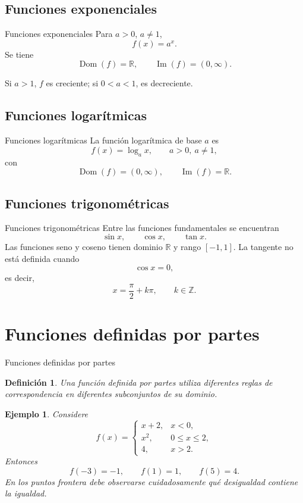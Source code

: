 \documentclass[aspectratio=169,10pt]{beamer}
\newtheorem{definicion}{Definición}
\newtheorem{ejemplo}{Ejemplo}
\newcommand{\R}{\mathbb{R}}
\newcommand{\Dom}{\operatorname{Dom}}
\newcommand{\Ima}{\operatorname{Im}}
\begin{document}
\subsection{Funciones exponenciales}
\begin{frame}{Funciones exponenciales}
Para $a>0$, $a\neq1$,
\[
f(x)=a^x.
\]
Se tiene
\[
\Dom(f)=\R,\qquad \Ima(f)=(0,\infty).
\]

Si $a>1$, $f$ es creciente; si $0<a<1$, es decreciente.
\end{frame}
\subsection{Funciones logarítmicas}
\begin{frame}{Funciones logarítmicas}
La función logarítmica de base $a$ es
\[
f(x)=\log_a x,
\qquad a>0,\ a\neq1,
\]
con
\[
\Dom(f)=(0,\infty),\qquad\Ima(f)=\R.
\]
\end{frame}
\subsection{Funciones trigonométricas}
\begin{frame}{Funciones trigonométricas}
Entre las funciones fundamentales se encuentran
\[
\sin x,\qquad\cos x,\qquad\tan x.
\]
Las funciones seno y coseno tienen dominio $\R$ y rango $[-1,1]$. La tangente
no está definida cuando
\[
\cos x=0,
\]
es decir,
\[
x=\frac{\pi}{2}+k\pi,\qquad k\in\mathbb Z.
\]

\end{frame}
\section{Funciones definidas por partes}
\begin{frame}{Funciones definidas por partes}
\begin{definicion}
Una función definida por partes utiliza diferentes reglas de correspondencia en
diferentes subconjuntos de su dominio.
\end{definicion}

\begin{ejemplo}
Considere
\[
f(x)=
\begin{cases}
x+2,&x<0,\\
x^2,&0\leq x\leq2,\\
4,&x>2.
\end{cases}
\]
Entonces
\[
f(-3)=-1,\qquad f(1)=1,\qquad f(5)=4.
\]
En los puntos frontera debe observarse cuidadosamente qué desigualdad contiene
la igualdad.
\end{ejemplo}

\end{frame}
\end{document}
